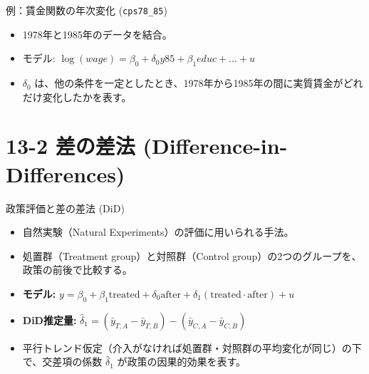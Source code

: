 \documentclass[
  ignorenonframetext,
]{beamer}
\providecommand{\tightlist}{%
  \setlength{\itemsep}{0pt}\setlength{\parskip}{0pt}}
\begin{document}
\begin{frame}{例：賃金関数の年次変化 (\texttt{cps78\_85})}
\label{ux4f8bux8cc3ux91d1ux95a2ux6570ux306eux5e74ux6b21ux5909ux5316-cps78_85}
\begin{itemize}
\tightlist
\item
  1978年と1985年のデータを結合。
\item
  モデル:
  \(\log(wage) = \beta_0 + \delta_0 y85 + \beta_1 educ + \dots + u\)
\item
  \(\delta_0\)
  は、他の条件を一定としたとき、1978年から1985年の間に実質賃金がどれだけ変化したかを表す。
\end{itemize}
\end{frame}

\section{13-2 差の差法
(Difference-in-Differences)}\label{ux5deeux306eux5deeux6cd5-difference-in-differences}

\begin{frame}{政策評価と差の差法 (DiD)}
\label{ux653fux7b56ux8a55ux4fa1ux3068ux5deeux306eux5deeux6cd5-did}
\begin{itemize}
\tightlist
\item
  自然実験（Natural Experiments）の評価に用いられる手法。
\item
  処置群（Treatment group）と対照群（Control
  group）の2つのグループを、政策の前後で比較する。
\item
  \textbf{モデル:}
  \(y = \beta_0 + \beta_1 \text{treated} + \delta_0 \text{after} + \delta_1 (\text{treated} \cdot \text{after}) + u\)
\item
  \textbf{DiD推定量:}
  \(\hat{\delta}_1 = (\bar{y}_{T,A} - \bar{y}_{T,B}) - (\bar{y}_{C,A} - \bar{y}_{C,B})\)
\item
  平行トレンド仮定（介入がなければ処置群・対照群の平均変化が同じ）の下で、交差項の係数
  \(\hat{\delta}_1\) が政策の因果的効果を表す。
\end{itemize}
\end{frame}
\end{document}
